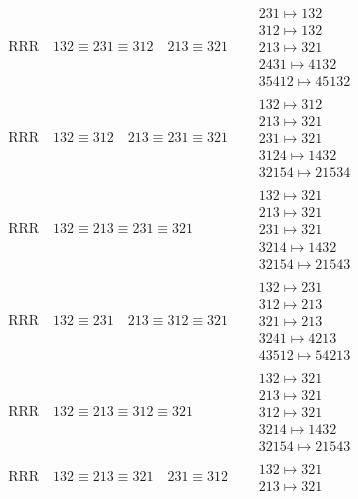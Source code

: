 \documentclass{article}
\begin{document}
\begin{align}
\text{RRR}
\quad
132\equiv231\equiv312
\quad
213\equiv321
\quad
&
\begin{matrix}
231 \mapsto 132
\\
312 \mapsto 132
\\
213 \mapsto 321
\\
2431 \mapsto 4132
\\
35412 \mapsto 45132
\end{matrix}
\\
\text{RRR}
\quad
132\equiv312
\quad
213\equiv231\equiv321
\quad
&
\begin{matrix}
132 \mapsto 312
\\
213 \mapsto 321
\\
231 \mapsto 321
\\
3124 \mapsto 1432
\\
32154 \mapsto 21534
\end{matrix}
\\
\text{RRR}
\quad
132\equiv213\equiv231\equiv321
\quad
&
\begin{matrix}
132 \mapsto 321
\\
213 \mapsto 321
\\
231 \mapsto 321
\\
3214 \mapsto 1432
\\
32154 \mapsto 21543
\end{matrix}
\\
\text{RRR}
\quad
132\equiv231
\quad
213\equiv312\equiv321
\quad
&
\begin{matrix}
132 \mapsto 231
\\
312 \mapsto 213
\\
321 \mapsto 213
\\
3241 \mapsto 4213
\\
43512 \mapsto 54213
\end{matrix}
\\
\text{RRR}
\quad
132\equiv213\equiv312\equiv321
\quad
&
\begin{matrix}
132 \mapsto 321
\\
213 \mapsto 321
\\
312 \mapsto 321
\\
3214 \mapsto 1432
\\
32154 \mapsto 21543
\end{matrix}
\\
\text{RRR}
\quad
132\equiv213\equiv321
\quad
231\equiv312
\quad
&
\begin{matrix}
132 \mapsto 321
\\
213 \mapsto 321

\end{matrix}
\end{align}
\end{document}

